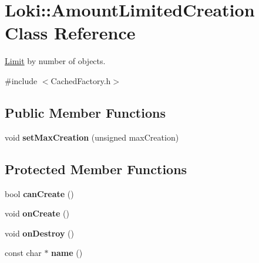 \hypertarget{classLoki_1_1AmountLimitedCreation}{}\section{Loki\+:\+:Amount\+Limited\+Creation Class Reference}
\label{classLoki_1_1AmountLimitedCreation}


\hyperlink{classLimit}{Limit} by number of objects.  




{\ttfamily \#include $<$Cached\+Factory.\+h$>$}

\subsection*{Public Member Functions}
\begin{DoxyCompactItemize}
\item 
\hypertarget{classLoki_1_1AmountLimitedCreation_a9a58222f8a3c72c68c6d0df6343c9bc2}{}void {\bfseries set\+Max\+Creation} (unsigned max\+Creation)\label{classLoki_1_1AmountLimitedCreation_a9a58222f8a3c72c68c6d0df6343c9bc2}

\end{DoxyCompactItemize}
\subsection*{Protected Member Functions}
\begin{DoxyCompactItemize}
\item 
\hypertarget{classLoki_1_1AmountLimitedCreation_a34f40f022197c7e9ec74898105b379e9}{}bool {\bfseries can\+Create} ()\label{classLoki_1_1AmountLimitedCreation_a34f40f022197c7e9ec74898105b379e9}

\item 
\hypertarget{classLoki_1_1AmountLimitedCreation_aea057bad31c6cdc6176829496b8d5bf3}{}void {\bfseries on\+Create} ()\label{classLoki_1_1AmountLimitedCreation_aea057bad31c6cdc6176829496b8d5bf3}

\item 
\hypertarget{classLoki_1_1AmountLimitedCreation_a99170f38e9837d5a9f5382b37bfb6945}{}void {\bfseries on\+Destroy} ()\label{classLoki_1_1AmountLimitedCreation_a99170f38e9837d5a9f5382b37bfb6945}

\item 
\hypertarget{classLoki_1_1AmountLimitedCreation_a07b90847a2511fb1374428ce5013bea5}{}const char $\ast$ {\bfseries name} ()\label{classLoki_1_1AmountLimitedCreation_a07b90847a2511fb1374428ce5013bea5}

\end{DoxyCompactItemize}


